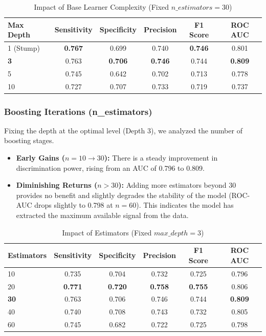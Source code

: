 \documentclass[12pt,a4paper]{article}
\begin{document}
\begin{table}[h!]
\centering
\begin{tabular}{lccccc}
\toprule
\textbf{Max Depth} & \textbf{Sensitivity} & \textbf{Specificity} & \textbf{Precision} & \textbf{F1 Score} & \textbf{ROC AUC} \\
\midrule
1 (Stump) & \textbf{0.767} & 0.699 & 0.740 & \textbf{0.746} & 0.801 \\
\rowcolor{gray!10} \textbf{3} & 0.763 & \textbf{0.706} & \textbf{0.746} & 0.744 & \textbf{0.809} \\
5 & 0.745 & 0.642 & 0.702 & 0.713 & 0.778 \\
10 & 0.727 & 0.707 & 0.733 & 0.719 & 0.737 \\
\bottomrule
\end{tabular}
\caption{Impact of Base Learner Complexity (Fixed $n\_estimators=30$)}
\label{tab:adaboost_results}
\end{table}

\subsubsection*{Boosting Iterations (n\_estimators)}
Fixing the depth at the optimal level (Depth 3), we analyzed the number of boosting stages.

\begin{itemize}
    \item \textbf{Early Gains ($n=10 \to 30$):} There is a steady improvement in discrimination power, rising from an AUC of 0.796 to 0.809.
    \item \textbf{Diminishing Returns ($n > 30$):} Adding more estimators beyond 30 provides no benefit and slightly degrades the stability of the model (ROC-AUC drops slightly to 0.798 at $n=60$). This indicates the model has extracted the maximum available signal from the data.
\end{itemize}

\begin{table}[h!]
\centering
\begin{tabular}{lccccc}
\toprule
\textbf{Estimators} & \textbf{Sensitivity} & \textbf{Specificity} & \textbf{Precision} & \textbf{F1 Score} & \textbf{ROC AUC} \\
\midrule
10 & 0.735 & 0.704 & 0.732 & 0.725 & 0.796 \\
\rowcolor{gray!10} 20 & \textbf{0.771} & \textbf{0.720} & \textbf{0.758} & \textbf{0.755} & 0.806 \\
\textbf{30} & 0.763 & 0.706 & 0.746 & 0.744 & \textbf{0.809} \\
40 & 0.740 & 0.708 & 0.743 & 0.732 & 0.805 \\
60 & 0.745 & 0.682 & 0.722 & 0.725 & 0.798 \\
\bottomrule
\end{tabular}
\caption{Impact of Estimators (Fixed $max\_depth=3$)}
\end{table}
\end{document}
